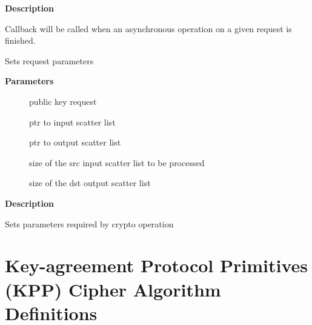 \documentclass[a4paper,8pt,english]{sphinxmanual}
\begin{document}
\textbf{Description}

Callback will be called when an asynchronous operation on a given
request is finished.

\begin{fulllineitems}
\label{crypto/api-akcipher:c.akcipher_request_set_crypt}
Sets request parameters

\end{fulllineitems}


\textbf{Parameters}
\begin{description}
\item[{}] \leavevmode
public key request

\item[{}] \leavevmode
ptr to input scatter list

\item[{}] \leavevmode
ptr to output scatter list

\item[{}] \leavevmode
size of the src input scatter list to be processed

\item[{}] \leavevmode
size of the dst output scatter list

\end{description}

\textbf{Description}

Sets parameters required by crypto operation


\section{Key-agreement Protocol Primitives (KPP) Cipher Algorithm Definitions}
\label{crypto/api-kpp::doc}\label{crypto/api-kpp:key-agreement-protocol-primitives-kpp-cipher-algorithm-definitions}

\begin{fulllineitems}
\label{crypto/api-kpp:c.kpp_request}
\end{fulllineitems}
\end{document}
